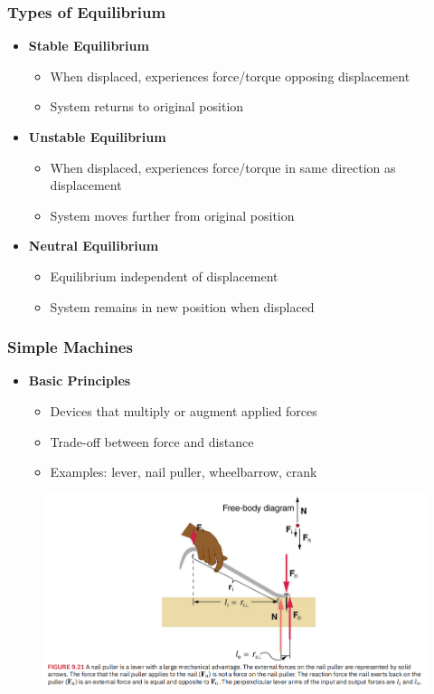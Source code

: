 \documentclass{beamer}
\begin{document}
\begin{frame}
\frametitle{Types of Equilibrium}
\begin{itemize}
    \item \textbf{Stable Equilibrium}
    \begin{itemize}
        \item When displaced, experiences force/torque opposing displacement
        \item System returns to original position
    \end{itemize}
    \item \textbf{Unstable Equilibrium}
    \begin{itemize}
        \item When displaced, experiences force/torque in same direction as displacement
        \item System moves further from original position
    \end{itemize}
    \item \textbf{Neutral Equilibrium}
    \begin{itemize}
        \item Equilibrium independent of displacement
        \item System remains in new position when displaced
    \end{itemize}
\end{itemize}
\end{frame}

\begin{frame}
\frametitle{Simple Machines}
\begin{itemize}
    \item \textbf{Basic Principles}
    \begin{itemize}
        \item Devices that multiply or augment applied forces
        \item Trade-off between force and distance
        \item Examples: lever, nail puller, wheelbarrow, crank
    \end{itemize}
    \end{itemize}
\begin{figure}[H]
    \centering
    \includegraphics[width=1\linewidth]{Screenshot 2024-11-04 120252.png}
\end{figure}
    
\end{frame}
\end{document}
